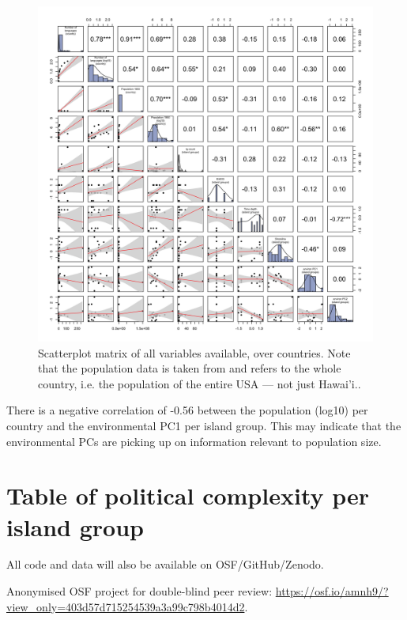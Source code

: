 \documentclass[unnumsec,webpdf,modern,medium]{oup-authoring-template}
\begin{document}
\begin{appendices}
\begin{figure}[ht]
    \includegraphics[width=\textwidth]{latex/SPLOM_country_all_variables}
\caption{Scatterplot matrix of all variables available, over countries. Note that the population data is taken from \citet{UN_pop} and refers to the whole country, i.e. the population of the entire USA --- not just Hawai'i..}
\label{SPLOM_country_all_variables}
\end{figure}


There is a negative correlation of -0.56 between the population (log10) per country and the environmental PC1 per island group. This may indicate that the environmental PCs are picking up on information relevant to population size.

\FloatBarrier

\section{Table of political complexity per island group }
\singlespacing
All code and data will also be available on OSF/GitHub/Zenodo.

Anonymised OSF project for double-blind peer review: \url{https://osf.io/amnh9/?view_only=403d57d715254539a3a99c798b4014d2}.

 \begin{landscape}
     

\end{landscape}
\end{appendices}
\end{document}
